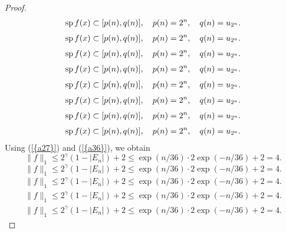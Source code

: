 \documentclass{amsart}
\numberwithin{equation}{section}
\begin{document}
\begin{proof}
{\begin{align*}
{{\rm sp\,}} f(x)\subset [p(n),q(n)],\quad p(n)=2^n,\quad q(n)=u_{2^n}.
\end{align*}\fi   
{}\begin{align}
{{\rm sp\,}} f(x)\subset [p(n),q(n)],\quad p(n)=2^n,\quad q(n)=u_{2^n}.
\end{align}\fi    
{}\begin{gather*}
{{\rm sp\,}} f(x)\subset [p(n),q(n)],\quad p(n)=2^n,\quad q(n)=u_{2^n}.
\end{gather*}\fi  
{}\begin{gather}
{{\rm sp\,}} f(x)\subset [p(n),q(n)],\quad p(n)=2^n,\quad q(n)=u_{2^n}.
\end{gather}\fi   
{}\begin{multline*}
{{\rm sp\,}} f(x)\subset [p(n),q(n)],\quad p(n)=2^n,\quad q(n)=u_{2^n}.
\end{multline*}\fi  
{}\begin{multline}
{{\rm sp\,}} f(x)\subset [p(n),q(n)],\quad p(n)=2^n,\quad q(n)=u_{2^n}.
\end{multline}\fi  
{}\begin{multline*}\begin{split}
{{\rm sp\,}} f(x)\subset [p(n),q(n)],\quad p(n)=2^n,\quad q(n)=u_{2^n}.
\end{split}\end{multline*}\fi
{}\begin{multline}\begin{split}
{{\rm sp\,}} f(x)\subset [p(n),q(n)],\quad p(n)=2^n,\quad q(n)=u_{2^n}.
\end{split}\end{multline}\fi
}
Using {(\ref{{a27}})} and {(\ref{{a36}})}, we obtain
{
\begin{equation*} 
\|f\|_1\le 2^\gamma(1-|E_n|)+2\le \exp(n/36)\cdot 2\exp(-n/36)+2=  4.
 \end{equation*}\fi  
{}\begin{equation}
\|f\|_1\le 2^\gamma(1-|E_n|)+2\le \exp(n/36)\cdot 2\exp(-n/36)+2=  4.
\end{equation}\fi   
{}\begin{align*}
\|f\|_1\le 2^\gamma(1-|E_n|)+2\le \exp(n/36)\cdot 2\exp(-n/36)+2=  4.
\end{align*}\fi   
{}\begin{align}
\|f\|_1\le 2^\gamma(1-|E_n|)+2\le \exp(n/36)\cdot 2\exp(-n/36)+2=  4.
\end{align}\fi    
{}\begin{gather*}
\|f\|_1\le 2^\gamma(1-|E_n|)+2\le \exp(n/36)\cdot 2\exp(-n/36)+2=  4.

\end{gather*}}
\end{proof}
\end{document}

